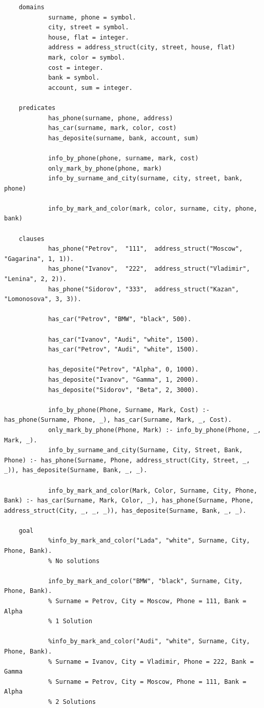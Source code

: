 \documentclass[12pt]{report}
\begin{document}
\begin{lstlisting}
	domains
			surname, phone = symbol.
			city, street = symbol.
			house, flat = integer.
			address = address_struct(city, street, house, flat)
			mark, color = symbol.
			cost = integer.
			bank = symbol.
			account, sum = integer.
	
	predicates
			has_phone(surname, phone, address)
			has_car(surname, mark, color, cost)
			has_deposite(surname, bank, account, sum)
			
			info_by_phone(phone, surname, mark, cost)
			only_mark_by_phone(phone, mark)
			info_by_surname_and_city(surname, city, street, bank, phone)
			
			info_by_mark_and_color(mark, color, surname, city, phone, bank)
	
	clauses
			has_phone("Petrov",  "111",  address_struct("Moscow",     "Gagarina", 1, 1)).
			has_phone("Ivanov",  "222",  address_struct("Vladimir",   "Lenina", 2, 2)).
			has_phone("Sidorov", "333",  address_struct("Kazan",      "Lomonosova", 3, 3)).
			
			has_car("Petrov", "BMW", "black", 500).
			
			has_car("Ivanov", "Audi", "white", 1500).
			has_car("Petrov", "Audi", "white", 1500).
			
			has_deposite("Petrov", "Alpha", 0, 1000).
			has_deposite("Ivanov", "Gamma", 1, 2000).
			has_deposite("Sidorov", "Beta", 2, 3000).
			
			info_by_phone(Phone, Surname, Mark, Cost) :- has_phone(Surname, Phone, _), has_car(Surname, Mark, _, Cost).
			only_mark_by_phone(Phone, Mark) :- info_by_phone(Phone, _, Mark, _).
			info_by_surname_and_city(Surname, City, Street, Bank, Phone) :- has_phone(Surname, Phone, address_struct(City, Street, _, _)), has_deposite(Surname, Bank, _, _).
			
			info_by_mark_and_color(Mark, Color, Surname, City, Phone, Bank) :- has_car(Surname, Mark, Color, _), has_phone(Surname, Phone, address_struct(City, _, _, _)), has_deposite(Surname, Bank, _, _).
	
	goal
			%info_by_mark_and_color("Lada", "white", Surname, City, Phone, Bank).
			% No solutions
			
			info_by_mark_and_color("BMW", "black", Surname, City, Phone, Bank).
			% Surname = Petrov, City = Moscow, Phone = 111, Bank = Alpha
			% 1 Solution
			
			%info_by_mark_and_color("Audi", "white", Surname, City, Phone, Bank).
			% Surname = Ivanov, City = Vladimir, Phone = 222, Bank = Gamma
			% Surname = Petrov, City = Moscow, Phone = 111, Bank = Alpha
			% 2 Solutions
\end{lstlisting}
\end{document}
